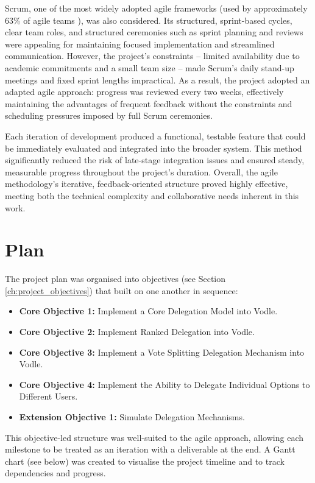 Scrum, one of the most widely adopted agile frameworks (used by approximately 63\% of agile teams \citep{versionone2020stateofagile}), was also considered. Its structured, sprint-based cycles, clear team roles, and structured ceremonies such as sprint planning and reviews were appealing for maintaining focused implementation and streamlined communication. However, the project's constraints -- limited availability due to academic commitments and a small team size -- made Scrum's daily stand-up meetings and fixed sprint lengths impractical. As a result, the project adopted an adapted agile approach: progress was reviewed every two weeks, effectively maintaining the advantages of frequent feedback without the constraints and scheduling pressures imposed by full Scrum ceremonies.

Each iteration of development produced a functional, testable feature that could be immediately evaluated and integrated into the broader system. This method significantly reduced the risk of late-stage integration issues and ensured steady, measurable progress throughout the project's duration. Overall, the agile methodology's iterative, feedback-oriented structure proved highly effective, meeting both the technical complexity and collaborative needs inherent in this work.
\section{Plan}

The project plan was organised into objectives (see Section \ref{ch:project_objectives}) that built on one another in sequence:

\begin{itemize}
    \item \textbf{Core Objective 1:} Implement a Core Delegation Model into Vodle.
    \item \textbf{Core Objective 2:} Implement Ranked Delegation into Vodle.
    \item \textbf{Core Objective 3:} Implement a Vote Splitting Delegation Mechanism into Vodle.
    \item \textbf{Core Objective 4:} Implement the Ability to Delegate Individual Options to Different Users.
    \item \textbf{Extension Objective 1:} Simulate Delegation Mechanisms.
\end{itemize}

This objective-led structure was well-suited to the agile approach, allowing each milestone to be treated as an iteration with a deliverable at the end. A Gantt chart (see below) was created to visualise the project timeline and to track dependencies and progress.


